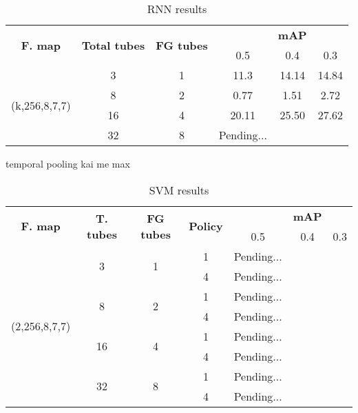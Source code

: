 \begin{table}[h]
  \centering
  \begin{tabular}{|| c | c | c || c c c||}
    \hline
    \multirow{2}{*}{\textbf{F. map}} & \multirow{2}{*}{\textbf{Total tubes}} & \multirow{2}{*}{\textbf{FG tubes}} & {} & \textbf{mAP} & {} \\
    {}  & {} & {} & 0.5 & 0.4 & 0.3 \\
    \hline
    \multirow{4}{*}{(k,256,8,7,7)} & 3 & 1 & 11.3 & 14.14 & 14.84 \\
    \cline{2-6}
    {} & 8 & 2 & 0.77 & 1.51 & 2.72 \\
    \cline{2-6}
    {} & 16 & 4 & 20.11	& 25.50 & 27.62 \\
    \cline{2-6}
    {} & 32 & 8 & Pending... \\
    \hline

  \end{tabular}
  \caption{RNN results }
  \label{table:rnn_increased}
\end{table}
  
temporal pooling kai me max
\begin{table}[h]
  \centering
  \begin{tabular}{|| c | c | c | c || c c c||}
    \hline
    \multirow{2}{*}{\textbf{F. map}} & \multirow{2}{*}{\textbf{T. tubes}} & \multirow{2}{*}{\textbf{FG tubes}} & \multirow{2}{*}{\textbf{Policy}} & {} & \textbf{mAP} & {} \\
    {}  & {} & {} & {} & 0.5 & 0.4 & 0.3 \\
    \hline
    \multirow{8}{*}{(2,256,8,7,7)} & \multirow{2}{*}{3} & \multirow{2}{*}{1} & 1 & Pending...\\
    \cline{4-7}
    {} & {} & {} & 4 & Pending... \\
    \cline{2-7}
    {} & \multirow{2}{*}{8} & \multirow{2}{*}{2} & 1 &  Pending... \\
    \cline{4-7}
    {} & {} & {} & 4 & Pending... \\
    \cline{2-7}
    {} & \multirow{2}{*}{16} & \multirow{2}{*}{4} & 1 &  Pending... \\
    \cline{4-7}
    {} & {} & {} & 4 & Pending... \\
    \cline{2-7}
    {} & \multirow{2}{*}{32} & \multirow{2}{*}{8} & 1 &  Pending... \\
    \cline{4-7}
    {} & {} & {} & 4 & Pending... \\

    \hline

  \end{tabular}
  \caption{SVM results }
  \label{table:svm_increased}
\end{table}
  
